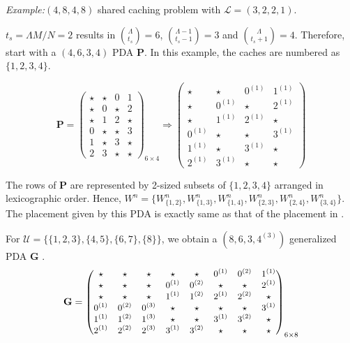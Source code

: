 \documentclass[conference,a4paper,10pt]{IEEEtran}
\begin{document}
\textit{Example:}$(4,8,4,8)$ shared caching problem with $\mathcal{L}=(3,2,2,1)$.

$t_s = \Lambda M/N =2$ results in $\binom{\Lambda}{t_s}=6$, $\binom{\Lambda-1}{t_s-1}=3$ and $\binom{\Lambda}{t_s+1}=4$. Therefore, start with a $(4,6,3,4)$ PDA $\mathbf{P}$. In this example, the caches are numbered as $\{1,2,3,4\}$.



\[ \mathbf{P} = 
\begin{pmatrix}
\star & \star & {0}  & {1} \\
\star & {0} & \star &  {2}\\
\star & {1} & {2} & \star \\
{0} & \star & \star & {3}\\
{1} & \star & {3} & \star \\ 
{2}  & {3} & \star & \star
\end{pmatrix}_{6 \times 4}
\Longrightarrow
\begin{pmatrix}
\star & \star & {0}^{(1)}  & {1}^{(1)} \\
\star & {0}^{(1)} & \star &  {2}^{(1)}\\
\star & {1}^{(1)} & {2}^{(1)} & \star \\
{0}^{(1)} & \star & \star & {3}^{(1)}\\
{1}^{(1)} & \star & {3}^{(1)} & \star \\ 
{2}^{(1)}  & {3}^{(1)} & \star & \star
\end{pmatrix}
\]

The rows of $\mathbf{P}$ are represented by 2-sized subsets of $\{1,2,3,4\}$ arranged in lexicographic order. Hence, $W^n = \{W^n_{\{1,2\}}, W^n_{\{1,3\}}, W^n_{\{1,4\}}, W^n_{\{2,3\}}, W^n_{\{2,4\}}, W^n_{\{3,4\}}\}$. The placement given by this PDA is exactly same as that of the placement in \cite{PUE}.

For $\mathcal{U}=\{\{1,2,3\},\{4,5\},\{6,7\},\{8\}\}$, we obtain a $(8,6,3,4^{(3)})$ generalized PDA $\mathbf{G}$ .
$$ \small{  \mathbf{G} =
\begin{pmatrix}
\star & \star & \star & \star & \star & {0^{(1)}} &  {0^{(2)}}& {1^{(1)}} \\
\star & \star & \star & {0^{(1)}} &  {0^{(2)}} & \star & \star & {2^{(1)}} \\
\star & \star & \star & {1^{(1)}} & {1^{(2)}} & {2^{(1)}} & {2^{(2)}} & \star \\
{0^{(1)}} & {0^{(2)}} & {0^{(3)}}& \star & \star & \star & \star & {3^{(1)}}\\
{1^{(1)}}& {1^{(2)}} & {1^{(3)}} & \star & \star & {3^{(1)}} & {3^{(2)}} & \star \\
{2^{(1)}}& {2^{(2)}} & {2^{(3)}} & {3^{(1)}} & {3^{(2)}} & \star & \star & \star  
\end{pmatrix}_{6 \times 8}}$$
\end{document}

